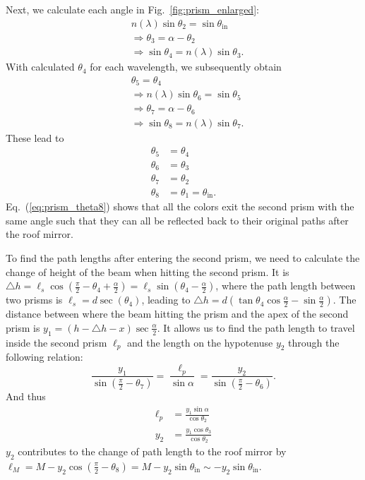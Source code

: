 \documentclass[12pt,hidelinks]{book}
\begin{document}
Next, we calculate each angle in Fig.~\ref{fig:prism_enlarged}:
\begin{subequations}
\begin{align}
& n(\lambda)\sin\theta_2=\sin\theta_{\text{in}} \\
&\Rightarrow \theta_3=\alpha-\theta_2 \\
&\Rightarrow \sin\theta_4=n(\lambda)\sin\theta_3.
\end{align}
\end{subequations}
With calculated $\theta_4$ for each wavelength, we subsequently obtain
\begin{subequations}
\begin{align}
& \theta_5=\theta_4 \\
&\Rightarrow n(\lambda)\sin\theta_6=\sin\theta_5 \\
&\Rightarrow \theta_7=\alpha-\theta_6 \\
&\Rightarrow \sin\theta_8=n(\lambda)\sin\theta_7.
\end{align}
\end{subequations}
These lead to
\begin{subequations}
\begin{align}
\theta_5 & =\theta_4 \\
\theta_6 & =\theta_3 \\
\theta_7 & =\theta_2 \\
\theta_8 & =\theta_1=\theta_{\text{in}}. \label{eq:prism_theta8}
\end{align}
\label{eq:prism_theta_equivalent}
\end{subequations}
Eq.~(\ref{eq:prism_theta8}) shows that all the colors exit the second prism with the same angle such that they can all be reflected back to their original paths after the roof mirror. 

To find the path lengths after entering the second prism, we need to calculate the change of height of the beam when hitting the second prism. It is $\triangle h=\ell_s\cos(\frac{\pi}{2}-\theta_4+\frac{\alpha}{2})=\ell_s\sin(\theta_4-\frac{\alpha}{2})$, where the path length between two prisms is $\ell_s=d\sec(\theta_4)$, leading to $\triangle h=d\left(\tan\theta_4\cos\frac{\alpha}{2}-\sin\frac{\alpha}{2}\right)$. The distance between where the beam hitting the prism and the apex of the second prism is $y_1=\left(h-\triangle h-x\right)\sec\frac{\alpha}{2}$. It allows us to find the path length to travel inside the second prism $\ell_p$ and the length on the hypotenuse $y_2$ through the following relation:
\begin{equation}
\frac{y_1}{\sin(\frac{\pi}{2}-\theta_7)}=\frac{\ell_p}{\sin\alpha}=\frac{y_2}{\sin(\frac{\pi}{2}-\theta_6)}.
\end{equation}
And thus
\begin{subequations}
\begin{align}
\ell_p & =\frac{y_1\sin\alpha}{\cos\theta_2} \\
y_2 & =\frac{y_1\cos\theta_3}{\cos\theta_2}
\end{align}
\label{eq:prism_lpy2}
\end{subequations}
$y_2$ contributes to the change of path length to the roof mirror by $\ell_M=M-y_2\cos(\frac{\pi}{2}-\theta_8)=M-y_2\sin\theta_{\text{in}}\sim-y_2\sin\theta_{\text{in}}$.
\end{document}
